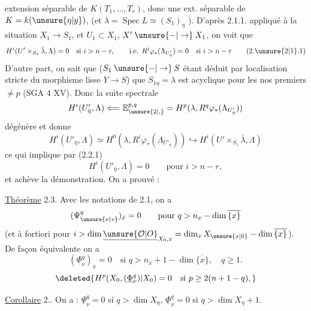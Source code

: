 extension  séparable de $K(T_1,\ldots,T_r)$, donc une ext. séparable de $K=k(\unsure{\eta|y})$, (et $\lambda=\operatorname{Spec}L\simeq(S_1)_\eta$ ). D'après 2.1.1. appliqué à la situation $X_1\to S_1$, et $U_1\subset X_1$, $X'\mathbin{\unsure{-|\to}}X_1$, on voit que
\[
H^i(U'\times_{S_1}\bar\lambda,\Lambda)=0\quad\text{si }i>n-r,\qquad
\text{i.e. }R^i\varphi_*(\Lambda_{U'_{\bar\eta}})=0\quad\text{si }i>n-r
\tag*{(2.\unsure{2|1}.1)}
\]
D'autre part,  on sait que  ($S_1\mathbin{\unsure{-|\to}}S$ étant déduit par localisation stricte du morphisme lisse $Y\to S$) que $S_{1\eta}=\lambda$ est acyclique pour les nos premiers $\ne p$ (SGA 4 XV). Donc la suite spectrale
\[
H^i(U'_{\bar\eta},\Lambda)\Longleftarrow\mathbb E_{\unsure{2|,}}^{p,q}=H^p(\lambda,R^q\varphi_*(\Lambda_{U'_{\bar\eta}}))
\]
dégénère et donne
\[
H^i(U'_{\bar\eta},\Lambda)\simeq H^0(\lambda,R^i\varphi_*(\Lambda_{U'_{\bar\eta}}))\hookrightarrow H^i(U'\times_{S_1}\bar\lambda,\Lambda)
\tag*{(2.2.2)}
\]
ce qui implique par (2.2.1)
\[
H^i(U'_{\bar\eta},\Lambda)=0\qquad\text{pour }i>n-r,
\]
et achève la démonstration. On a prouvé :

\uline{Théorème} 2.3. Avec les notations de 2.1, on a 
\[
(\Psi^q_{\unsure{\nu|v}})_{\bar x}=0\qquad\text{pour }q>n_x-\dim\overline{\{x\}}
\]
(et à fortiori pour $i>\dim\underline{\unsure{\mathcal O|O}}_{X_0,x}=\dim_x X_{\unsure{x|0}}-\dim\overline{\{x\}}$).
De façon équivalente on a
\[
(\underline\Phi^q_\nu)_{\bar x}=0\quad\text{si }q>n_x+1-\dim\overline{\{x\}},\quad q\geq1.
\]
\[
\deleted{H^p(X_0,(\underline\Phi^q_\nu)|X_0)=0\quad\text{si }p\geq2(n+1-q),}
\]


\uline{Corollaire} 2.. On a : $\underline\Psi^q_\nu=0$ si $q>\dim X_\eta$, $\underline\Phi^q_\nu=0$ si $q>\dim X_\eta+1$.
